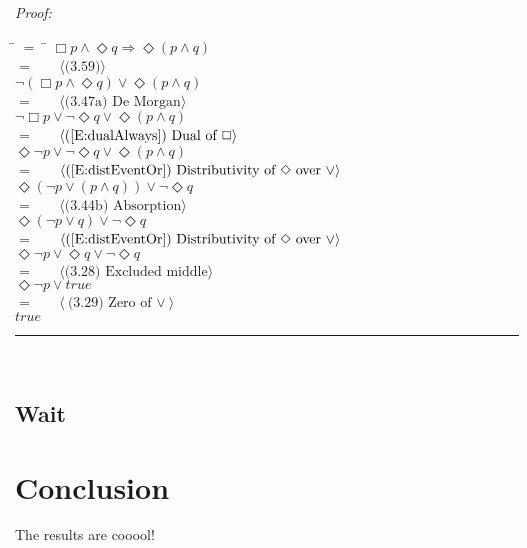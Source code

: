 \documentclass[fleqn, leqno]{article}
\newcommand{\lgap}{2pt}                             %
\newcommand{\mymathindent}{24pt}                    %
\newcommand{\Event}{\Diamond}
\newcommand{\Always}{\Box}
\newcommand{\myqed}{\hfill\rule[-.23ex]{1.2ex}{2.0ex}}
\newcommand{\Gll} {\langle}                         %
\newcommand{\Ggg} {\rangle}                         %
\newcommand{\Hint}[1]     {\ \ \ $\Gll              \mbox{#1} \Ggg$ }   %
\begin{document}
\emph{Proof:}
\begin{tabbing}
\hspace{\mymathindent} \= $= \;$ \= \kill
  \> \>   $\Always p \land \Event q \Rightarrow \Event (p \land q)$\\[\lgap]
  \> $=$  \>  \Hint{(3.59)}\\[\lgap]
  \> \>   $\lnot(\Always p \land \Event q) \lor \Event(p \land q)$\\[\lgap]
  \> $=$  \>  \Hint{(3.47a) De Morgan}\\[\lgap]
  \> \>   $\lnot\Always p \lor \lnot\Event q \lor \Event(p \land q)$\\[\lgap]
  \> $=$  \>  \Hint{(\ref{E:dualAlways}) Dual of $\Always$}\\[\lgap]
  \> \>   $\Event\lnot p \lor \lnot\Event q \lor \Event(p \land q)$\\[\lgap]
  \> $=$  \>  \Hint{(\ref{E:distEventOr}) Distributivity of $\Event$ over $\lor$}\\[\lgap]
  \> \>   $\Event(\lnot p \lor (p \land q)) \lor \lnot\Event q$\\[\lgap]
  \> $=$  \>  \Hint{(3.44b) Absorption}\\[\lgap]
  \> \>   $\Event(\lnot p \lor q) \lor \lnot\Event q$\\[\lgap]
  \> $=$  \>  \Hint{(\ref{E:distEventOr}) Distributivity of $\Event$ over $\lor$}\\[\lgap]
  \> \>   $\Event\lnot p \lor \Event q \lor \lnot\Event q$\\[\lgap]
  \> $=$  \>  \Hint{(3.28) Excluded middle}\\[\lgap]
  \> \>   $\Event\lnot p \lor true$\\[\lgap]
  \> $=$  \>  \Hint{(3.29) Zero of $\lor$}\\[\lgap]
  \> \>   $true$\\[\lgap]
\end{tabbing}
\myqed\\[\lgap]

\subsection{Wait}

\section{Conclusion}

The results are cooool!\\



\end{document}
